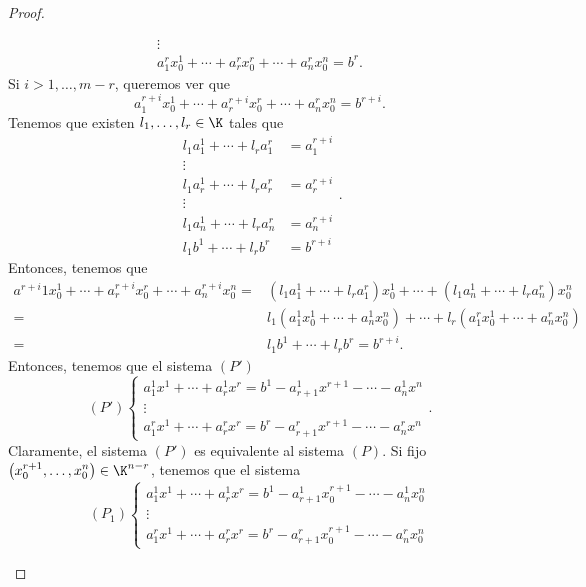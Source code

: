 \begin{proof}
\begin{description}
\[\begin{split}
\vdots \\
a^{r}_{1}x^{1}_{0} + \cdots + a^{r}_{r}x^{r}_{0} + \cdots + a^{r}_{n}x^{n}_{0} = b^{r}.
\end{split}\]
Si $\displaystyle i > 1, \ldots, m - r $, queremos ver que
\[ a^{r+i}_{1}x^{1}_{0} + \cdots + a^{r+i}_{r}x^{r}_{0} + \cdots + a^{r}_{n}x^{n}_{0} = b^{r+i}.\]
Tenemos que existen $\displaystyle l_{1}, \ldots, l_{r}\in\K $ tales que 
\[
\begin{split}
	l_{1}a^{1}_{1} + \cdots + l_{r}a^{r}_{1} & = a_{1}^{r+i} \\
	\vdots & \\
	l_{1}a^{1}_{r} + \cdots + l_{r}a^{r}_{r} & = a^{r+i}_{r} \\
	\vdots & \\
	l_{1}a^{1}_{n} + \cdots + l_{r}a^{r}_{n} & = a^{r+i}_{n}\\
	l_{1}b^{1} + \cdots + l_{r}b^{r} & = b^{r+i}
\end{split}
.\]
Entonces, tenemos que
\[
\begin{split}
	a^{r+i}1x^{1}_{0} + \cdots + a^{r+i}_{r} x^{r}_{0} + \cdots + a^{r+i}_{n}x_{0}^{n} = & \left(l_{1} a^{1}_{1} + \cdots +l_{r}a^{r}_{1}\right)x^{1}_{0} + \cdots + \left(l_{1}a^{1}_{n} + \cdots +l_{r}a^{r}_{n}\right)x^{n}_{0} \\
	= & l_{1}\left(a^{1}_{1}x^{1}_{0} + \cdots + a^{1}_{n}x^{n}_{0}\right) + \cdots + l_{r}\left(a^{r}_{1}x^{1}_{0} + \cdots + a^{r}_{n}x^{n}_{0}\right)\\
	= & l_{1}b^{1} + \cdots + l_{r}b^{r} = b^{r+i} .
\end{split}
\]
Entonces, tenemos que el sistema $\displaystyle \left(P'\right) $ 
\[\left(P'\right)
\begin{cases}
	a^{1}_{1}x^{1} + \cdots + a^{1}_{r}x^{r} = b^{1}-a^{1}_{r+1}x^{r+1}-\cdots -a^{1}_{n}x^{n} \\
	\vdots \\
	a^{r}_{1}x^{1} + \cdots + a^{r}_{r} x^{r} = b^{r}-a^{r}_{r+1}x^{r+1}-\cdots-a^{r}_{n}x^{n}
\end{cases}
.\]
Claramente, el sistema $\displaystyle \left(P'\right) $ es equivalente al sistema $\displaystyle \left(P\right) $. Si fijo $\displaystyle \left(x^{r+1}_{0}, \ldots, x^{n}_{0}\right) \in \K^{n-r} $, tenemos que el sistema 
\[\left(P_{1}\right)
\begin{cases}
	a^{1}_{1}x^{1} + \cdots + a^{1}_{r}x^{r} = b^{1}-a^{1}_{r+1}x^{r+1}_{0}-\cdots -a^{1}_{n}x^{n}_{0} \\
	\vdots \\
	a^{r}_{1}x^{1} + \cdots + a^{r}_{r} x^{r} = b^{r}-a^{r}_{r+1}x^{r+1}_{0}-\cdots-a^{r}_{n}x^{n}_{0}

\end{cases}\]
\end{description}
\end{proof}
